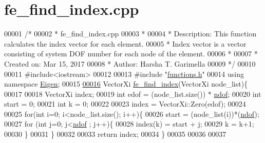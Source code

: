 \hypertarget{fe__find__index_8cpp_source}{}\section{fe\+\_\+find\+\_\+index.\+cpp}
\label{fe__find__index_8cpp_source}

\begin{DoxyCode}
00001 \textcolor{comment}{/*}
00002 \textcolor{comment}{ * fe\_find\_index.cpp}
00003 \textcolor{comment}{ *}
00004 \textcolor{comment}{ * Description: This function calculates the index vector for each element.}
00005 \textcolor{comment}{ * Index vector is a vector consisting of system DOF number for each node of the element.}
00006 \textcolor{comment}{ *}
00007 \textcolor{comment}{ *  Created on: Mar 15, 2017}
00008 \textcolor{comment}{ *  Author: Harsha T. Garimella}
00009 \textcolor{comment}{ */}
00010 
00011 \textcolor{preprocessor}{#include<iostream>}
00012 
00013 \textcolor{preprocessor}{#include "\hyperlink{functions_8h}{functions.h}"}
00014 \textcolor{keyword}{using namespace }\hyperlink{namespace_eigen}{Eigen};
00015 
\hyperlink{fe__find__index_8cpp_ae4dbe24b761cafa3577afab76726b382}{00016} VectorXi \hyperlink{fe__find__index_8cpp_ae4dbe24b761cafa3577afab76726b382}{fe\_find\_index}(VectorXi node\_list)\{
00017 
00018     VectorXi index;
00019     \textcolor{keywordtype}{int} edof = (node\_list.size()) * \hyperlink{_global_variables_8h_aa789fe4d8a13fd0990b630909430d5d0}{ndof};
00020     \textcolor{keywordtype}{int} start = 0;
00021     \textcolor{keywordtype}{int} k = 0;
00022 
00023     index = VectorXi::Zero(edof);
00024 
00025     \textcolor{keywordflow}{for}(\textcolor{keywordtype}{int} i=0; i<node\_list.size(); i++)\{
00026         start = (node\_list(i))*(\hyperlink{_global_variables_8h_aa789fe4d8a13fd0990b630909430d5d0}{ndof});
00027         \textcolor{keywordflow}{for} (\textcolor{keywordtype}{int} j=0; j<\hyperlink{_global_variables_8h_aa789fe4d8a13fd0990b630909430d5d0}{ndof} ; j++)\{
00028             index(k) = start + j;
00029             k = k+1;
00030         \}
00031     \}
00032 
00033     \textcolor{keywordflow}{return} index;
00034 \}
00035 
00036 
00037 
\end{DoxyCode}
